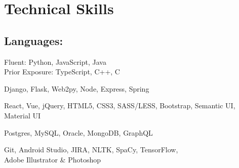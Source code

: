 \documentclass[]{hieudo-build}
\begin{document}
\hfill
\begin{minipage}[t]{0.3\textwidth} 

\section{Technical Skills}
\begin{flushleft}
\narrower
\subsection{Languages:}
\normalsize
  Fluent: Python, JavaScript, Java \\
  \smallskip
  Prior Exposure: TypeScript, C++, C
\sectionsep

\normalsize
  Django, Flask, Web2py, Node, Express, Spring
\sectionsep

\normalsize
  React, Vue,
  jQuery, HTML5, CSS3, SASS/LESS, Bootstrap, Semantic UI, Material UI
\sectionsep

\normalsize
  Postgres, MySQL, Oracle, MongoDB, GraphQL
\sectionsep

\normalsize
  Git, Android Studio, JIRA, NLTK, SpaCy, TensorFlow, 
  \\
  Adobe Illustrator \& Photoshop
\end{flushleft}





\end{minipage}
\end{document}

